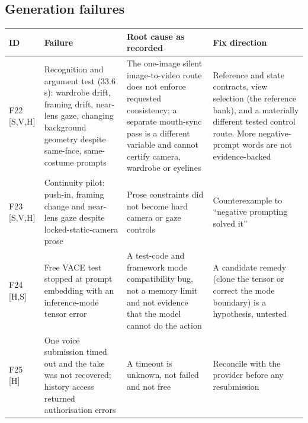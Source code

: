 \documentclass[11pt,a4paper]{article}
\begin{document}
\subsection{Generation failures}
\begin{longtable}{@{}P{1.0cm}P{3.6cm}P{5.6cm}P{5.3cm}@{}}
\toprule \textbf{ID} & \textbf{Failure} & \textbf{Root cause as recorded} & \textbf{Fix direction}\\ \midrule\endhead
F22 [S,V,H] & Recognition and argument test (33.6 s): wardrobe drift, framing drift, near-lens gaze, changing background geometry despite same-face, same-costume prompts & The one-image silent image-to-video route does not enforce requested consistency; a separate mouth-sync pass is a different variable and cannot certify camera, wardrobe or eyelines & Reference and state contracts, view selection (the reference bank), and a materially different tested control route. More negative-prompt words are not evidence-backed\\
F23 [S,V,H] & Continuity pilot: push-in, framing change and near-lens gaze despite locked-static-camera prose & Prose constraints did not become hard camera or gaze controls & Counterexample to ``negative prompting solved it''\\
F24 [H,S] & Free VACE test stopped at prompt embedding with an inference-mode tensor error & A test-code and framework mode compatibility bug, not a memory limit and not evidence that the model cannot do the action & A candidate remedy (clone the tensor or correct the mode boundary) is a hypothesis, untested\\
F25 [H] & One voice submission timed out and the take was not recovered; history access returned authorisation errors & A timeout is unknown, not failed and not free & Reconcile with the provider before any resubmission\\
\bottomrule
\end{longtable}
\end{document}
